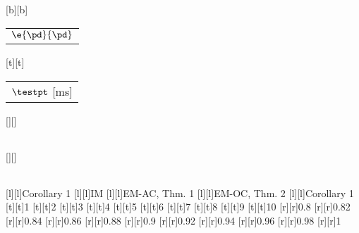 %    
%
%
%
[b][b]{\fontsize{8}{12}\selectfont \color[rgb]{0,0,0}\setlength{\tabcolsep}{0pt}\begin{tabular}{c}$\e{\pd}{\pd}$\end{tabular}}%
[t][t]{\fontsize{8}{12}\selectfont \color[rgb]{0,0,0}\setlength{\tabcolsep}{0pt}\begin{tabular}{c}$\testpt$ [ms]\end{tabular}}%
[][]{\fontsize{10}{15}\selectfont \color[rgb]{0,0,0}\setlength{\tabcolsep}{0pt}\begin{tabular}{c} \end{tabular}}%
[][]{\fontsize{10}{15}\selectfont \color[rgb]{0,0,0}\setlength{\tabcolsep}{0pt}\begin{tabular}{c} \end{tabular}}%
[l][l]{\fontsize{8}{12}\selectfont \color[rgb]{0,0,0}Corollary 1}%
[l][l]{\fontsize{8}{12}\selectfont \color[rgb]{0,0,0}IM}%
[l][l]{\fontsize{8}{12}\selectfont \color[rgb]{0,0,0}EM-AC, Thm. 1}%
[l][l]{\fontsize{8}{12}\selectfont \color[rgb]{0,0,0}EM-OC, Thm. 2}%
[l][l]{\fontsize{8}{12}\selectfont \color[rgb]{0,0,0}Corollary 1}%
%
\fontsize{8}{12}%
\selectfont%
%
[t][t]{1}%
[t][t]{2}%
[t][t]{3}%
[t][t]{4}%
[t][t]{5}%
[t][t]{6}%
[t][t]{7}%
[t][t]{8}%
[t][t]{9}%
[t][t]{10}%
%
[r][r]{0.8}%
[r][r]{0.82}%
[r][r]{0.84}%
[r][r]{0.86}%
[r][r]{0.88}%
[r][r]{0.9}%
[r][r]{0.92}%
[r][r]{0.94}%
[r][r]{0.96}%
[r][r]{0.98}%
[r][r]{1}%
%
%
